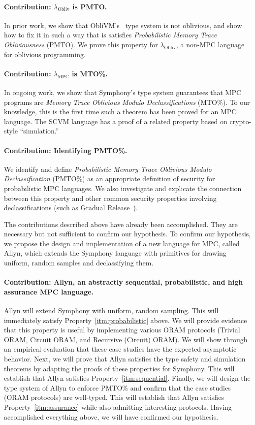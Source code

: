 \documentclass{report}
\newcommand{\lang}{Allyn\xspace}
\newcommand{\mpc}{\ensuremath{\lambda_{\mathrm{MPC}}}\xspace}
\newcommand{\obliv}{\ensuremath{\lambda_{\mathrm{Obliv}}}\xspace}
\begin{document}
\paragraph{Contribution: \obliv is PMTO.} In prior work, we show that ObliVM's~\cite{todo} type system is not oblivious,
and show how to fix it in such a way that is satisfies \emph{Probabilistic Memory Trace Obliviousness} (PMTO).
We prove this property for \obliv, a non-MPC language for oblivious programming.

\paragraph{Contribution: \mpc is MTO\%.} In ongoing work, we show that Symphony's type system guarantees that MPC programs are
\emph{Memory Trace Oblivious Modulo Declassifications} (MTO\%). To our knowledge, this is the first time such a theorem has been
proved for an MPC language. The SCVM language has a proof of a related property based on crypto-style ``simulation.''

\paragraph{Contribution: Identifying PMTO\%.} We identify and define \emph{Probabilistic Memory Trace Oblivious Modulo Declassification}
(PMTO\%) as an appropriate definition of security for probabilistic MPC languages. We also investigate and explicate the connection between
this property and other common security properties involving declassifications (such as Gradual Release~\cite{todo}).

The contributions described above have already been accomplished. They are necessary but not sufficient to confirm our hypothesis.
To confirm our hypothesis, we propose the design and implementation of a new language for MPC, called \lang, which extends the
Symphony language with primitives for drawing uniform, random samples and declassifying them.

\paragraph{Contribution: \lang, an abstractly sequential, probabilistic, and high assurance MPC language.}
\lang will extend Symphony with uniform, random sampling. This will immediately satisfy
Property~\ref{itm:probabilistic} above. We will provide evidence that this property is useful by
implementing various ORAM protocols (Trivial ORAM, Circuit ORAM, and Recursive (Circuit) ORAM). We will show through
an empirical evaluation that these case studies have the expected asymptotic behavior. Next, we will prove that \lang satisfies
the type safety and simulation theorems by adapting the proofs of these properties for Symphony. This will establish
that \lang satisfies Property~\ref{itm:sequential}.
Finally, we will design the type system of \lang to enforce PMTO\% and confirm that the case studies (ORAM protocols) are well-typed.
This will establish that \lang satisfies Property~\ref{itm:assurance} while also admitting interesting protocols. Having
accomplished everything above, we will have confirmed our hypothesis.
\end{document}
